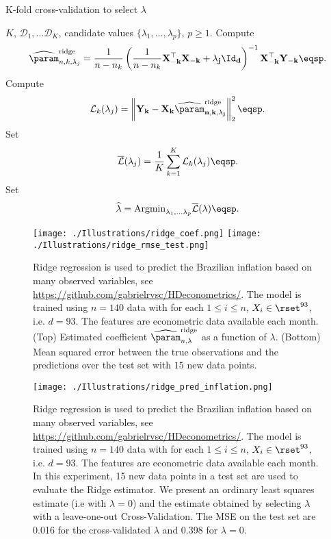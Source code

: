 \begin{algorithm}
\caption{K-fold cross-validation to select $\lambda$}\label{alg:cv:ridge}
\begin{algorithmic}
\Require $K$, $\mathcal{D}_1, \ldots \mathcal{D}_K$, candidate values $\{\lambda_1,\ldots,\lambda_p\}$, $p\geqslant 1$.
    \State Compute
$$
\widehat \param^{\mathrm{ridge}}_{n,k,\lambda_j} = \frac{1}{n-n_k}\left(\frac{1}{n-n_k}\bf{X}_{-k}^\top \bf{X}_{-k} + \lambda_j \Id_d\right)^{-1}\bf{X}_{-k}^\top \bf{Y}_{-k}\eqsp.
$$
    \State Compute
$$
\mathcal{L}_k(\lambda_j) = \left\|\bf{Y}_k - \bf{X}_k \widehat \param^{\mathrm{ridge}}_{n,k,\lambda_j}\right\|_2^2\eqsp.
$$ 
\EndFor
\State Set
$$
\overline{\mathcal{L}}(\lambda_j) = \frac{1}{K}\sum_{k=1}^{K}\mathcal{L}_k(\lambda_j)\eqsp.
$$
\EndFor
\State Set
$$
\widehat \lambda = \mathrm{Argmin}_{\lambda_1,\ldots\lambda_p}\overline{\mathcal{L}}(\lambda)\eqsp.
$$
\end{algorithmic}
\end{algorithm}
\begin{figure}
\begin{center}
\texttt{[image: ./Illustrations/ridge\_coef.png]}
\texttt{[image: ./Illustrations/ridge\_rmse\_test.png]}
\end{center}
\caption{Ridge regression is used to predict the Brazilian inflation based on many observed variables, see \url{https://github.com/gabrielrvsc/HDeconometrics/}. The model is trained using $n=140$ data with for each $1\leqslant i \leqslant n$, $X_i\in\rset^{93}$, i.e. $d  =93$. The features are econometric data available each month. (Top) Estimated coefficient $\widehat \param^{\mathrm{ridge}}_{n,\lambda}$ as a function of $\lambda$. (Bottom) Mean squared error between the true observations and the predictions over the test set with $15$ new data points.}
\end{figure}


\begin{figure}
\begin{center}
\texttt{[image: ./Illustrations/ridge\_pred\_inflation.png]}
\end{center}
\caption{Ridge regression is used to predict the Brazilian inflation based on many observed variables, see \url{https://github.com/gabrielrvsc/HDeconometrics/}. The model is trained using $n=140$ data with for each $1\leqslant i \leqslant n$, $X_i\in\rset^{93}$, i.e. $d  =93$. The features are econometric data available each month. In this experiment, 15 new data points in a test set are used to evaluate the Ridge estimator. We present an ordinary least squares estimate (i.e with $\lambda = 0$) and the estimate obtained by selecting $\lambda$ with a leave-one-out Cross-Validation. The MSE on the test set are 0.016 for the cross-validated $\lambda$ and 0.398 for $\lambda = 0$.}
\end{figure}



